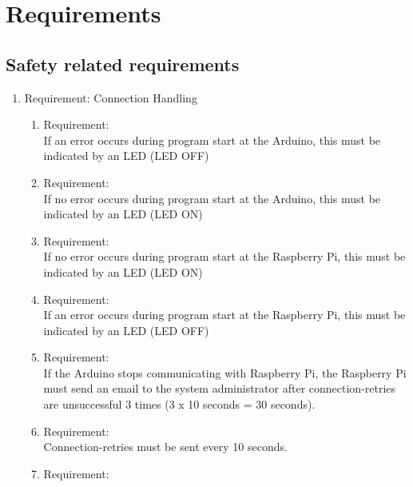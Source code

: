 \section{Requirements}
\label{chapter4}



\subsection{Safety related requirements}

	\begin{enumerate}[label*=\arabic*.]
		\item \label{req.1}  Requirement: Connection Handling \\
		\begin{enumerate}[label*=\arabic*.]
			\item \label{req.1.1}  Requirement:  \\
			If an error occurs during program start at the Arduino, this must be indicated by an LED (LED OFF)\\ 
			\item \label{req.1.2} Requirement:   \\
			If no error occurs during program start at the Arduino, this must be indicated by an LED (LED ON)\\ 
			\item \label{req.1.3} Requirement:   \\
			If no error occurs during program start at the Raspberry Pi, this must be indicated by an LED (LED ON)\\    
			\item \label{req.1.4} Requirement:   \\
			If an error occurs during program start at the Raspberry Pi, this must be indicated by an LED (LED OFF)\\    
			\item \label{req.1.5} Requirement:   \\
			If the Arduino stops communicating with Raspberry Pi, the Raspberry Pi must send an email to the system administrator after connection-retries are unsuccessful 3 times (3 x 10 seconds = 30 seconds).\\    
   			\item \label{req.1.6} Requirement:   \\
            Connection-retries must be sent every 10 seconds.\\
			\item \label{req.1.7} Requirement:   \\

\end{enumerate}
\end{enumerate}
